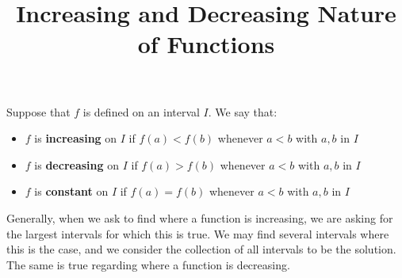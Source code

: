\documentclass{ximera}
\title[Dig-In:]{Increasing and Decreasing Nature of Functions}
\begin{document}
\begin{abstract}
 \end{abstract}
\maketitle

Suppose that $f$ is defined on an interval $I$. We say that:

\begin{itemize}
\item $f$ is {\bf increasing} on $I$ if $f(a)< f(b)$ whenever $a<b$ with $a,b$ in $I$
\item $f$ is {\bf decreasing} on $I$ if $f(a)> f(b)$ whenever $a<b$ with $a,b$ in $I$
\item $f$ is {\bf constant} on $I$ if $f(a)=f(b)$ whenever $a<b$ with $a,b$ in $I$
\end{itemize}

Generally, when we ask to find where a function is increasing, we are asking for the largest intervals for which 
this is true. We may find several intervals where this is the case, and we consider the collection of all intervals to
be the solution. The same is true regarding where a function is decreasing.
\end{document}
